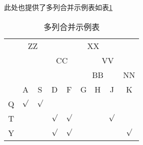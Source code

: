 此处也提供了多列合并示例表如表\ref{duoliehebing}
\begin{table}[htbp]
        \small
        \centering
        \caption{多列合并示例表}
        \begin{tabular}{ccccccccc}
                \toprule
                & \multicolumn{2}{c}{ZZ}& \multicolumn{6}{c}{XX}\\
                \cmidrule(lr){2-3} \cmidrule(lr){4-9}
                &   &   & \multicolumn{2}{c}{CC}&\multicolumn{4}{c}{VV}\\
                \cmidrule(lr){4-5} \cmidrule(lr){6-9}
                &   &   &   &   & \multicolumn{3}{c}{BB}&NN\\
                \cmidrule(lr){6-8} \cmidrule(lr){9-9}
                & A &S	&D &F &G &H &J &K \\ \midrule
                Q&$\surd$&$\surd$&   &   &   &    & &\\
                T&	&		& $\surd$ & $\surd$   &   &  &$\surd$     &\\
                Y&	&		& $\surd$ & $\surd$   &   &  &    &$\surd$ \\ \bottomrule
        \end{tabular}
        \label{duoliehebing}
\end{table}
